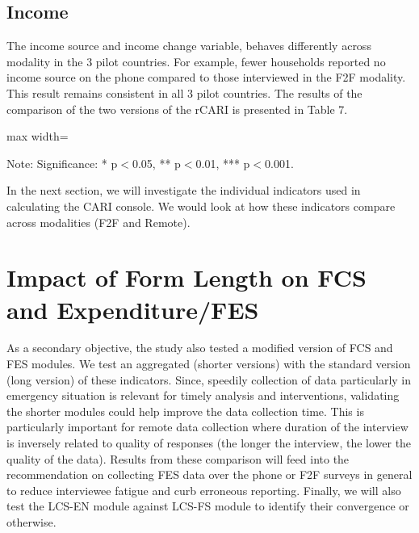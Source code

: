 \documentclass[11pt,harvard]{article}
\begin{document}
	\pagebreak
	
	\subsection{Income}
	
	The income source and income change variable, behaves differently across modality in the 3 pilot countries. For example, fewer households reported no income source on the phone compared to those interviewed in the F2F modality. This result remains consistent in all 3 pilot countries. The results of the comparison of the two versions of the rCARI is presented in Table 7.   
	
	\begin{table}[htbp]
		\centering
		\begin{adjustbox}{max width=\textwidth}
			\begin{threeparttable}
				\caption{Impact of Survey Modality on Income}
				\scriptsize
				 
				\label{tab:INC_Modality_All_Country}
				\begin{tablenotes}
					\item Note: Significance: * p$<$0.05, ** p$<$0.01, *** p$<$0.001. 
				\end{tablenotes}
			\end{threeparttable}
		\end{adjustbox}
	\end{table}
	
	In the next section, we will investigate the individual indicators used in calculating the CARI console. We would look at how these indicators compare across modalities (F2F and Remote).
	
	\pagebreak
	
	\section{Impact of Form Length on FCS and Expenditure/FES}
	
	As a secondary objective, the study also tested a modified version of FCS and FES modules. We test an aggregated (shorter versions) with the standard version (long version) of these indicators. Since, speedily collection of data particularly in emergency situation is relevant for timely analysis and interventions, validating the shorter modules could help improve the data collection time. This is particularly important for remote data collection where duration of the interview is inversely related to quality of responses (the longer the interview, the lower the quality of the data). 
	Results from these comparison will feed into the recommendation on collecting FES data over the phone or F2F surveys in general to reduce interviewee fatigue and curb erroneous reporting. Finally, we will also test the LCS-EN module against LCS-FS module to identify their convergence or otherwise. 
	
\end{document}
